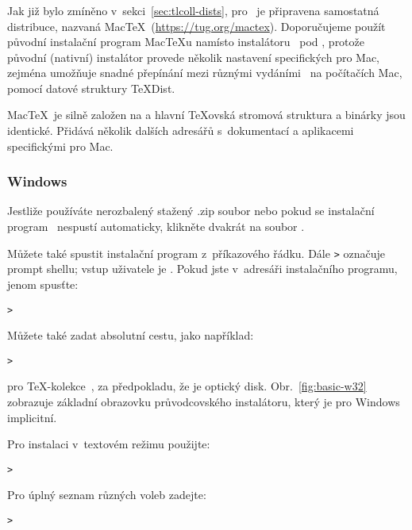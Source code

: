 \documentclass[\classoptions,slovak,english,czech]{\classname}
\newcommand\TKCS{\textsf{\TeX-kolekce}}
\begin{document}
\subsubsection{\MacOSX}
\label{sec:macosx}

Jak již bylo zmíněno v~sekci~\ref{sec:tlcoll-dists}, pro \MacOSX\ je 
připravena samostatná distribuce, nazvaná 
Mac\TeX\ (\url{https://tug.org/mactex}).
Doporučujeme použít původní instalační program 
Mac\TeX u namísto instalátoru \TL\
pod \MacOSX, protože původní (nativní) instalátor provede  
několik nastavení specifických pro Mac, zejména umožňuje 
snadné přepínání mezi různými vydáními \TL\ na počítačích Mac, pomocí %
datové struktury \TeX{}Dist. 

Mac\TeX\ je silně založen na \TL a hlavní \TeX ovská stromová 
struktura a binárky jsou identické. Přidává několik dalších adresářů 
s~dokumentací a aplikacemi specifickými pro Mac.

\subsubsection{Windows}\label{sec:wininst}

Jestliže používáte nerozbalený stažený .zip soubor nebo pokud se instalační 
program \DVD\ nespustí automaticky, klikněte 
dvakrát na soubor . 

Můžete také spustit instalační program z~příkazového řádku.
Dále \texttt{>} označuje prompt shellu; 
vstup uživatele je . 
Pokud jste v~adresáři instalačního programu, jenom spusťte:
\begin{alltt}
> 
\end{alltt}

Můžete také zadat absolutní cestu, jako například:
\begin{alltt}
> 
\end{alltt}
pro \TKCS\ \DVD, za předpokladu, že  je optický disk.
Obr.~\ref{fig:basic-w32} zobrazuje základní obrazovku průvodcovského 
instalátoru, který je pro Windows implicitní.

Pro instalaci v~textovém režimu použijte:
\begin{alltt}
> 
\end{alltt}

Pro úplný seznam různých voleb zadejte:
\begin{alltt}
> 
\end{alltt}
\end{document}

